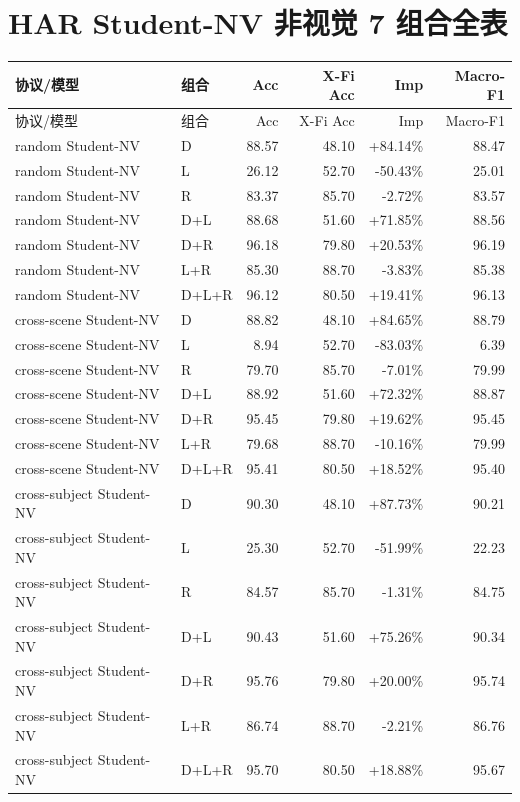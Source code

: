 \documentclass[UTF8,10pt]{ctexart}
\newcommand{\better}[1]{\textcolor{goodblue}{#1}}
\newcommand{\worse}[1]{\textcolor{badred}{#1}}
\begin{document}
\section{HAR Student-NV 非视觉 7 组合全表}
{\tiny
\begin{longtable}{llrrrr}
\toprule
协议/模型 & 组合 & Acc & X-Fi Acc & Imp & Macro-F1\\
\midrule
\endfirsthead
\toprule
协议/模型 & 组合 & Acc & X-Fi Acc & Imp & Macro-F1\\
\midrule
\endhead
random Student-NV & D & 88.57 & 48.10 & \better{+84.14\%} & 88.47\\
random Student-NV & L & 26.12 & 52.70 & \worse{-50.43\%} & 25.01\\
random Student-NV & R & 83.37 & 85.70 & \worse{-2.72\%} & 83.57\\
random Student-NV & D+L & 88.68 & 51.60 & \better{+71.85\%} & 88.56\\
random Student-NV & D+R & 96.18 & 79.80 & \better{+20.53\%} & 96.19\\
random Student-NV & L+R & 85.30 & 88.70 & \worse{-3.83\%} & 85.38\\
random Student-NV & D+L+R & 96.12 & 80.50 & \better{+19.41\%} & 96.13\\
cross-scene Student-NV & D & 88.82 & 48.10 & \better{+84.65\%} & 88.79\\
cross-scene Student-NV & L & 8.94 & 52.70 & \worse{-83.03\%} & 6.39\\
cross-scene Student-NV & R & 79.70 & 85.70 & \worse{-7.01\%} & 79.99\\
cross-scene Student-NV & D+L & 88.92 & 51.60 & \better{+72.32\%} & 88.87\\
cross-scene Student-NV & D+R & 95.45 & 79.80 & \better{+19.62\%} & 95.45\\
cross-scene Student-NV & L+R & 79.68 & 88.70 & \worse{-10.16\%} & 79.99\\
cross-scene Student-NV & D+L+R & 95.41 & 80.50 & \better{+18.52\%} & 95.40\\
cross-subject Student-NV & D & 90.30 & 48.10 & \better{+87.73\%} & 90.21\\
cross-subject Student-NV & L & 25.30 & 52.70 & \worse{-51.99\%} & 22.23\\
cross-subject Student-NV & R & 84.57 & 85.70 & \worse{-1.31\%} & 84.75\\
cross-subject Student-NV & D+L & 90.43 & 51.60 & \better{+75.26\%} & 90.34\\
cross-subject Student-NV & D+R & 95.76 & 79.80 & \better{+20.00\%} & 95.74\\
cross-subject Student-NV & L+R & 86.74 & 88.70 & \worse{-2.21\%} & 86.76\\
cross-subject Student-NV & D+L+R & 95.70 & 80.50 & \better{+18.88\%} & 95.67\\
\bottomrule
\end{longtable}
}
\end{document}
